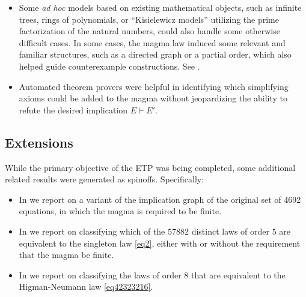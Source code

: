 \begin{itemize}
        \item Some \emph{ad hoc} models based on existing mathematical objects, such as infinite trees, rings of polynomials, or ``Kisielewicz models'' utilizing the prime factorization of the natural numbers, could also handle some otherwise difficult cases.  In some cases, the magma law induced some relevant and familiar structures, such as a directed graph or a partial order, which also helped guide counterexample constructions. See .
        \item Automated theorem provers were helpful in identifying which simplifying axioms could be added to the magma without jeopardizing the ability to refute the desired implication $E \vdash E'$.
\end{itemize}

\subsection{Extensions}

While the primary objective of the ETP was being completed, some additional related results were generated as spinoffs.  Specifically:
\begin{itemize}
\item In  we report on a variant of the implication graph of the original set of 4692 equations, in which the magma is required to be finite.
\item In  we report on classifying which of the $57882$ distinct laws of order $5$ are equivalent to the singleton law \eqref{eq2}, either with or without the requirement that the magma be finite.
\item In  we report on classifying the laws of order $8$ that are equivalent to the Higman-Neumann law \eqref{eq42323216}.
\end{itemize}

